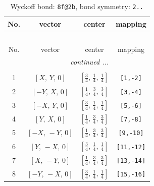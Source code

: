 \documentclass[fleqn,8pt]{jsarticle}
\begin{document}
\begin{longtable}{cccc}
\caption{Wyckoff bond: {\tt 8f@2b}, bond symmetry: {\tt 2..}}
 \\
 \hline \hline
No. & vector & center & mapping \\ \hline \endfirsthead

\multicolumn{3}{l}{\tablename\ \thetable{}} \\
 \hline \hline
No. & vector & center & mapping \\ \hline \endhead

 \hline \hline
\multicolumn{3}{r}{\footnotesize\it continued ...} \\ \endfoot

 \hline \hline
\multicolumn{3}{r}{} \\ \endlastfoot

1 & $\left[ X,\, Y,\, 0 \right]$ & $\left[ \frac{3}{4},\, \frac{1}{4},\, \frac{1}{4} \right]$ & {\tt [1,-2]} \\ \hline
2 & $\left[ - Y,\, X,\, 0 \right]$ & $\left[ \frac{1}{4},\, \frac{3}{4},\, \frac{3}{4} \right]$ & {\tt [3,-4]} \\ \hline
3 & $\left[ - X,\, Y,\, 0 \right]$ & $\left[ \frac{3}{4},\, \frac{1}{4},\, \frac{1}{4} \right]$ & {\tt [5,-6]} \\ \hline
4 & $\left[ Y,\, X,\, 0 \right]$ & $\left[ \frac{1}{4},\, \frac{3}{4},\, \frac{3}{4} \right]$ & {\tt [7,-8]} \\ \hline
5 & $\left[ - X,\, - Y,\, 0 \right]$ & $\left[ \frac{1}{4},\, \frac{3}{4},\, \frac{3}{4} \right]$ & {\tt [9,-10]} \\ \hline
6 & $\left[ Y,\, - X,\, 0 \right]$ & $\left[ \frac{3}{4},\, \frac{1}{4},\, \frac{1}{4} \right]$ & {\tt [11,-12]} \\ \hline
7 & $\left[ X,\, - Y,\, 0 \right]$ & $\left[ \frac{1}{4},\, \frac{3}{4},\, \frac{3}{4} \right]$ & {\tt [13,-14]} \\ \hline
8 & $\left[ - Y,\, - X,\, 0 \right]$ & $\left[ \frac{3}{4},\, \frac{1}{4},\, \frac{1}{4} \right]$ & {\tt [15,-16]} \\
\end{longtable}
\renewcommand{\arraystretch}{1.2}
\end{document}
